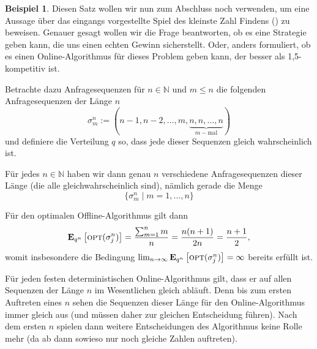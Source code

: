 \documentclass[a4paper,ngerman,12pt,bibtotoc]{scrartcl}
\theoremstyle{definition}
\newtheorem{bsp}[defn]{Beispiel}
\theoremstyle{plain}
\theoremstyle{remark}
\newcommand{\NN}{\mathbb{N}}
\renewcommand{\_}{\mathpunct{.}\,}
\newcommand{\?}{\,{:}\,}
\newcommand{\Opt}{\ensuremath{\textsc{opt}}}
\newcommand{\EE}{\mathbf{E}}
\newcommand{\sjn}{\sigma_j^n}
\begin{document}
	\begin{bsp}
		Diesen Satz wollen wir nun zum Abschluss noch verwenden, um eine Aussage über das eingangs vorgestellte Spiel des \glqq kleinste Zahl Findens\grqq{} () zu beweisen. Genauer gesagt wollen wir die Frage beantworten, ob es eine Strategie geben kann, die uns einen echten Gewinn sicherstellt. Oder, anders formuliert, ob es einen Online-Algorithmus für dieses Problem geben kann, der besser als 1,5-kompetitiv ist.
		
		Betrachte dazu Anfragesequenzen für $n\in\NN$ und $m \leq n$ die folgenden Anfragesequenzen der Länge $n$
			\[\sigma^n_m := (n-1, n-2, \dots, m, \underbrace{n, n, \dots, n}_{m-\text{mal}})\]
		und definiere die Verteilung $q$ so, dass jede dieser Sequenzen gleich wahrscheinlich ist.
		
		Für jedes $n \in\NN$ haben wir dann genau $n$ verschiedene Anfragesequenzen dieser Länge (die alle gleichwahrscheinlich sind), nämlich gerade die Menge
			\[\{\sigma^n_m\mid m = 1,\dots,n\}\]
		
		Für den optimalen Offline-Algorithmus gilt dann
		\begin{equation*}
			\EE_{q^n}\left[\Opt(\sigma^n_j)\right] = \frac{\sum_{m=1}^{n}m}{n} = \frac{n(n+1)}{2n} = \frac{n+1}{2},
		\end{equation*}
		womit insbesondere die Bedingung $\lim_{n \to \infty} \EE_{q^n}\left[\Opt(\sjn)\right] = \infty$ bereits erfüllt ist.
		
		Für jeden festen deterministischen Online-Algorithmus gilt, dass er auf allen Sequenzen der Länge $n$ im Wesentlichen gleich abläuft. Denn bis zum ersten Auftreten eines $n$ sehen die Sequenzen dieser Länge für den Online-Algorithmus immer gleich aus (und müssen daher zur gleichen Entscheidung führen). Nach dem ersten $n$ spielen dann weitere Entscheidungen des Algorithmus keine Rolle mehr (da ab dann sowieso nur noch gleiche Zahlen auftreten).
		

\end{bsp}
\end{document}
